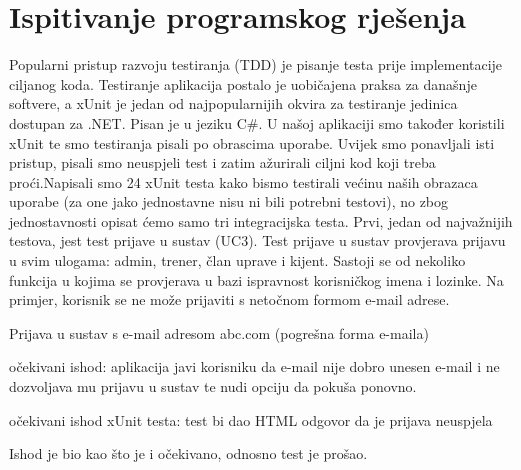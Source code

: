 			
			\eject 
		
	
		\section{Ispitivanje programskog rješenja}
			
		
			
			 \textnormal{Popularni pristup razvoju testiranja (TDD) je pisanje testa prije implementacije ciljanog koda.  	Testiranje aplikacija postalo je uobičajena praksa za današnje softvere, a xUnit je jedan od najpopularnijih okvira za testiranje jedinica dostupan za .NET. Pisan je u jeziku C\#. U našoj aplikaciji smo također koristili xUnit te smo testiranja pisali po obrascima uporabe. Uvijek smo ponavljali isti pristup, pisali smo neuspjeli test i zatim ažurirali ciljni kod koji treba proći.Napisali smo 24 xUnit testa kako bismo testirali većinu naših obrazaca uporabe (za one jako jednostavne nisu ni bili potrebni testovi), no zbog jednostavnosti opisat ćemo samo tri integracijska testa.}
			 \bigbreak
			 \textnormal {	Prvi, jedan od najvažnijih testova, jest test prijave u sustav (UC3). Test prijave u sustav provjerava prijavu u svim ulogama: admin, trener, član uprave i kijent. Sastoji se od nekoliko funkcija u kojima se provjerava u bazi ispravnost korisničkog imena i lozinke. Na primjer, korisnik se ne može prijaviti s netočnom formom e-mail adrese. }
			 	\begin{packed_item}
			 	
			 	\item Prijava u sustav s e-mail adresom abc.com (pogrešna forma e-maila)
			 	\item[] \begin{packed_enum}
			 		\item očekivani ishod: aplikacija javi korisniku da e-mail nije dobro unesen e-mail i ne dozvoljava mu prijavu u sustav te nudi opciju da pokuša ponovno.
			 		\item očekivani ishod xUnit testa: test bi dao HTML odgovor da je prijava neuspjela
			 	\end{packed_enum}
			 \end{packed_item}
		 \textnormal {Ishod je bio kao što je i očekivano, odnosno test je prošao.}
		 
